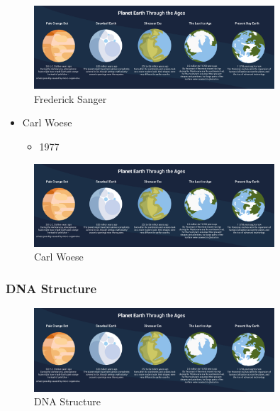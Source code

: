 \documentclass[
]{book}
\providecommand{\tightlist}{%
  \setlength{\itemsep}{0pt}\setlength{\parskip}{0pt}}
\begin{document}
\begin{figure}
\centering
\includegraphics[width=0.8\textwidth,height=\textheight]{./Figures/Planets.png}
\caption{Frederick Sanger}
\end{figure}

\begin{itemize}
\tightlist
\item
  Carl Woese

  \begin{itemize}
  \tightlist
  \item
    1977
  \end{itemize}
\end{itemize}

\begin{figure}
\centering
\includegraphics[width=0.8\textwidth,height=\textheight]{./Figures/Planets.png}
\caption{Carl Woese}
\end{figure}

\hypertarget{dna-structure}{%
\subsubsection*{DNA Structure}\label{dna-structure}}

\begin{figure}
\centering
\includegraphics[width=0.8\textwidth,height=\textheight]{./Figures/Planets.png}
\caption{DNA Structure}
\end{figure}
\end{document}
